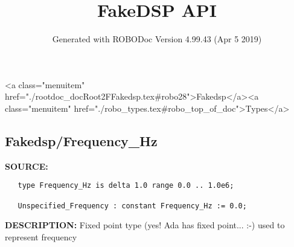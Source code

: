 \documentclass{article}
\title{FakeDSP API}
\author{Generated with ROBODoc Version 4.99.43 (Apr  5 2019)
}
\begin{document}
\maketitle
\printindex
\tableofcontents
\newpage

<a class="menuitem" href="./rootdoc_docRoot2FFakedsp.tex#robo28">Fakedsp</a><a class="menuitem" href="./robo_types.tex#robo_top_of_doc">Types</a>\subsection{Fakedsp/Frequency\_Hz}
\textbf{SOURCE:}\hspace{0.08in}\begin{verbatim}
   type Frequency_Hz is delta 1.0 range 0.0 .. 1.0e6;

   Unspecified_Frequency : constant Frequency_Hz := 0.0;
\end{verbatim}
\textbf{DESCRIPTION:}\hspace{0.08in}
   Fixed point type (yes! Ada has fixed point... :-) used to represent
   frequency
\end{document}
